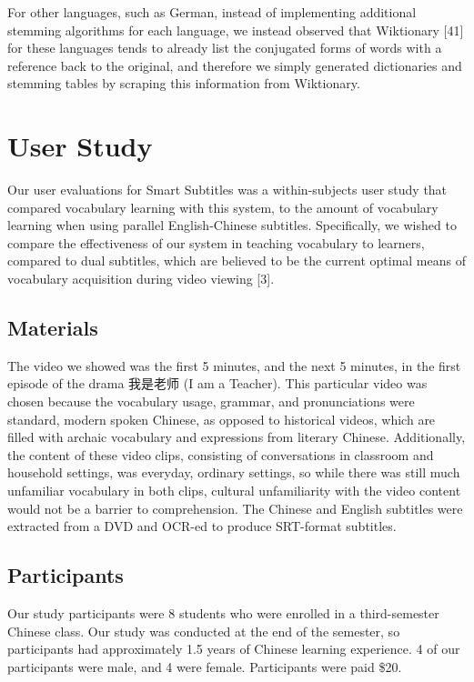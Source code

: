 \documentclass{sigchi}
\begin{document}
For other languages, such as German, instead of implementing additional stemming algorithms for each language, we instead observed that Wiktionary [41] for these languages tends to already list the conjugated forms of words with a reference back to the original, and therefore we simply generated dictionaries and stemming tables by scraping this information from Wiktionary.

\section{User Study}

Our user evaluations for Smart Subtitles was a within-subjects user study that compared vocabulary learning with this system, to the amount of vocabulary learning when using parallel English-Chinese subtitles. Specifically, we wished to compare the effectiveness of our system in teaching vocabulary to learners, compared to dual subtitles, which are believed to be the current optimal means of vocabulary acquisition during video viewing [3].

\subsection{Materials}

The video we showed was the first 5 minutes, and the next 5 minutes, in the first episode of the drama 我是老师 (I am a Teacher). This particular video was chosen because the vocabulary usage, grammar, and pronunciations were standard, modern spoken Chinese, as opposed to historical videos, which are filled with archaic vocabulary and expressions from literary Chinese. Additionally, the content of these video clips, consisting of conversations in classroom and household settings, was everyday, ordinary settings, so while there was still much unfamiliar vocabulary in both clips, cultural unfamiliarity with the video content would not be a barrier to comprehension. The Chinese and English subtitles were extracted from a DVD and OCR-ed to produce SRT-format subtitles.

\subsection{Participants}

Our study participants were 8 students who were enrolled in a third-semester Chinese class. Our study was conducted at the end of the semester, so participants had approximately 1.5 years of Chinese learning experience. 4 of our participants were male, and 4 were female.
Participants were paid \$20.
\end{document}
